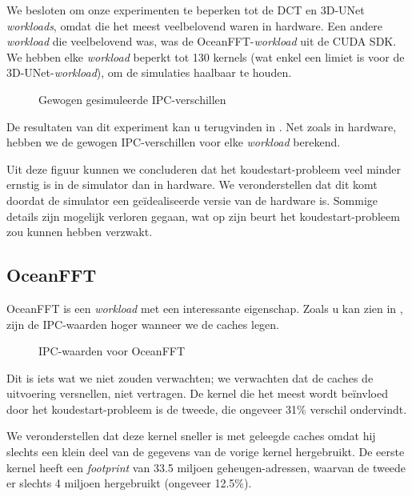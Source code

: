 \documentclass[5p,numvwe]{elsarticle}
\begin{document}
    We besloten om onze experimenten te beperken tot de DCT en 3D-UNet \textit{workloads}, omdat die het meest veelbelovend waren in hardware.
    Een andere \textit{workload} die veelbelovend was, was de OceanFFT-\textit{workload} uit de CUDA SDK\@.
    We hebben elke \textit{workload} beperkt tot 130 kernels (wat enkel een limiet is voor de 3D-UNet-\textit{workload}), om de simulaties haalbaar te houden.

    \begin{figure}[hb]
        \centering
        \caption{Gewogen gesimuleerde IPC-verschillen}
        \label{fig:w-sim-ipc}
    \end{figure}

    De resultaten van dit experiment kan u terugvinden in .
    Net zoals in hardware, hebben we de gewogen IPC-verschillen voor elke \textit{workload} berekend.

    Uit deze figuur kunnen we concluderen dat het koudestart-probleem veel minder ernstig is in de simulator dan in hardware.
    We veronderstellen dat dit komt doordat de simulator een geïdealiseerde versie van de hardware is.
    Sommige details zijn mogelijk verloren gegaan, wat op zijn beurt het koudestart-probleem zou kunnen hebben verzwakt.

    \subsection{OceanFFT}\label{subsec:oceanfft}
    OceanFFT is een \textit{workload} met een interessante eigenschap.
    Zoals u kan zien in , zijn de IPC-waarden hoger wanneer we de caches legen.

    \begin{figure}[ht]
        \centering
        \caption{IPC-waarden voor OceanFFT}
        \label{fig:sim-ocean}
    \end{figure}

    Dit is iets wat we niet zouden verwachten; we verwachten dat de caches de uitvoering versnellen, niet vertragen.
    De kernel die het meest wordt beïnvloed door het koudestart-probleem is de tweede, die ongeveer 31\% verschil ondervindt.

    We veronderstellen dat deze kernel sneller is met geleegde caches omdat hij slechts een klein deel van de gegevens van de vorige kernel hergebruikt.
    De eerste kernel heeft een \textit{footprint} van 33.5 miljoen geheugen-adressen, waarvan de tweede er slechts 4 miljoen hergebruikt (ongeveer 12.5\%).
\end{document}
